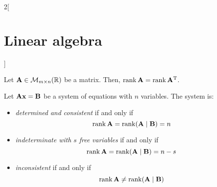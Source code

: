 \documentclass[../../../main.tex]{subfiles}
\begin{document}
\begin{multicols}{2}[\section{Linear algebra}]
  \begin{prop}
    Let $\boldsymbol{\mathrm{A}}\in\mathcal{M}_{m\times n}(\mathbb{R})$ be a matrix. Then, $\rank \boldsymbol{\mathrm{A}}=\rank\vb{A}^{\mathrm{T}}$.
  \end{prop}
  \begin{theorem}
    Let $\boldsymbol{\mathrm{A}}\boldsymbol{\mathrm{x}}=\boldsymbol{\mathrm{B}}$ be a system of equations with $n$ variables. The system is:
    \begin{itemize}
      \item \textit{determined and consistent} if and only if $$\rank \boldsymbol{\mathrm{A}}=\rank (\boldsymbol{\mathrm{A}}\mid \boldsymbol{\mathrm{B}})=n$$
      \item \textit{indeterminate with $s$ free variables} if and only if $$\rank \boldsymbol{\mathrm{A}}=\rank (\boldsymbol{\mathrm{A}}\mid \boldsymbol{\mathrm{B}})=n-s$$
      \item \textit{inconsistent} if and only if $$\rank \boldsymbol{\mathrm{A}}\ne\rank (\boldsymbol{\mathrm{A}}\mid \boldsymbol{\mathrm{B}})$$
    \end{itemize}
  \end{theorem}

\end{multicols}
\end{document}
